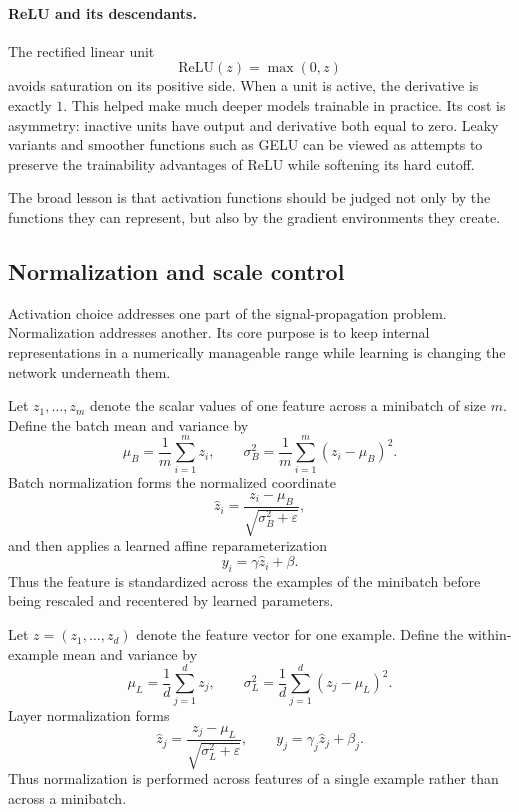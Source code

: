 \paragraph{ReLU and its descendants.}
The rectified linear unit
\[
\mathrm{ReLU}(z)=\max(0,z)
\]
avoids saturation on its positive side.
When a unit is active, the derivative is exactly $1$.
This helped make much deeper models trainable in practice.
Its cost is asymmetry: inactive units have output and derivative both equal to zero.
Leaky variants and smoother functions such as GELU can be viewed as attempts to preserve the trainability advantages of ReLU while softening its hard cutoff.

\medskip

The broad lesson is that activation functions should be judged not only by the functions they can represent, but also by the gradient environments they create.

\subsection*{Normalization and scale control}

Activation choice addresses one part of the signal-propagation problem.
Normalization addresses another.
Its core purpose is to keep internal representations in a numerically manageable range while learning is changing the network underneath them.

\begin{definition}
Let $z_{1},\dots,z_{m}$ denote the scalar values of one feature across a minibatch of size $m$.
Define the batch mean and variance by
\[
\mu_B=\frac{1}{m}\sum_{i=1}^m z_i,
\qquad
\sigma_B^2=\frac{1}{m}\sum_{i=1}^m (z_i-\mu_B)^2.
\]
Batch normalization forms the normalized coordinate
\[
\widehat z_i=\frac{z_i-\mu_B}{\sqrt{\sigma_B^2+\varepsilon}},
\]
and then applies a learned affine reparameterization
\[
y_i=\gamma \widehat z_i+\beta.
\]
Thus the feature is standardized across the examples of the minibatch before being rescaled and recentered by learned parameters.
\end{definition}

\begin{definition}
Let $z=(z_1,\dots,z_d)$ denote the feature vector for one example.
Define the within-example mean and variance by
\[
\mu_L=\frac{1}{d}\sum_{j=1}^d z_j,
\qquad
\sigma_L^2=\frac{1}{d}\sum_{j=1}^d (z_j-\mu_L)^2.
\]
Layer normalization forms
\[
\widehat z_j=\frac{z_j-\mu_L}{\sqrt{\sigma_L^2+\varepsilon}},
\qquad
y_j=\gamma_j \widehat z_j+\beta_j.
\]
Thus normalization is performed across features of a single example rather than across a minibatch.
\end{definition}

